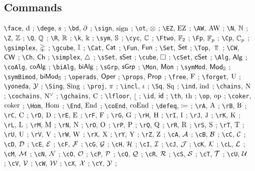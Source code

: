 \subsection*{Commands}

\verb|\face|, $\operatorname{d}$ ;
\verb|\dege|, $\operatorname{s}$ ;
\verb|\bd|, $\operatorname{\partial}$ ;
\verb|\sign|, $\operatorname{sign}$ ;
\verb|\ot|, $\otimes$ ;
\verb|\EZ|, $\operatorname{EZ}$ ;
\verb|\AW|, $\operatorname{AW}$ ;
\verb|\N|, $\mathbb{N}$ ;
\verb|\Z|, $\mathbb{Z}$ ;
\verb|\Q|, $\mathbb{Q}$ ;
\verb|\R|, $\mathbb{R}$ ;
\verb|\k|, $\Bbbk$ ;
\verb|\sym|, $\mathbb{S}$ ;
\verb|\cyc|, $\mathbb{C}$ ;
\verb|\Ftwo|, ${\mathbb{F}_2}$ ;
\verb|\Fp|, ${\mathbb{F}_p}$ ;
\verb|\Cp|, ${\mathbb{C}_p}$ ;
\verb|\gsimplex|, $\mathbb{\Delta}$ ;
\verb|\gcube|, $\mathbb{I}$ ;
\verb|\Cat|, $\mathsf{Cat}$ ;
\verb|\Fun|, $\mathsf{Fun}$ ;
\verb|\Set|, $\mathsf{Set}$ ;
\verb|\Top|, $\Top$ ;
\verb|\CW|, $\mathsf{CW}$ ;
\verb|\Ch|, $\mathsf{Ch}$ ;
\verb|\simplex|, $\triangle$ ;
\verb|\sSet|, $\mathsf{sSet}$ ;
\verb|\cube|, $\square$ ;
\verb|\cSet|, $\mathsf{cSet}$ ;
\verb|\Alg|, $\mathsf{Alg}$ ;
\verb|\coAlg|, $\mathsf{coAlg}$ ;
\verb|\biAlg|, $\mathsf{biAlg}$ ;
\verb|\sGrp|, $\mathsf{sGrp}$ ;
\verb|\Mon|, $\mathsf{Mon}$ ;
\verb|\symMod|, $\mathsf{Mod}_{\mathbb{S}}$ ;
\verb|\symBimod|, $\mathsf{biMod}_{\mathbb{S}}$ ;
\verb|\operads|, $\mathsf{Oper}$ ;
\verb|\props|, $\mathsf{Prop}$ ;
\verb|\free|, $\operatorname{F}$ ;
\verb|\forget|, $\operatorname{U}$ ;
\verb|\yoneda|, $\operatorname{\mathcal{Y}}$ ;
\verb|\Sing|, $\operatorname{Sing}$ ;
\verb|\proj|, $\operatorname{\pi}$ ;
\verb|\incl|, $\operatorname{\iota}$ ;
\verb|\Sq|, $\operatorname{Sq}$ ;
\verb|\ind|, $\operatorname{ind}$ ;
\verb|\chains|, $\operatorname{N}$ ;
\verb|\cochains|, $\operatorname{N^{\vee}}$ ;
\verb|\gchains|, $\operatorname{C}$ ;
\verb|\lfloor|, $\lfloor$ ;
\verb|\id|, $\mathsf{id}$ ;
\verb|\th|, $\mathrm{th}$ ;
\verb|\op|, $\mathrm{op}$ ;
\verb|\coker|, $\operatorname{coker}$ ;
\verb|\Hom|, $\mathrm{Hom}$ ;
\verb|\End|, $\mathrm{End}$ ;
\verb|\coEnd|, $\mathrm{coEnd}$ ;
\verb|\defeq|, $\coloneqq$ ;
\verb|\rA|, $\mathrm{A}$ ;
\verb|\rB|, $\mathrm{B}$ ;
\verb|\rC|, $\mathrm{C}$ ;
\verb|\rD|, $\mathrm{D}$ ;
\verb|\rE|, $\mathrm{E}$ ;
\verb|\rF|, $\mathrm{F}$ ;
\verb|\rG|, $\mathrm{G}$ ;
\verb|\rH|, $\mathrm{H}$ ;
\verb|\rI|, $\mathrm{I}$ ;
\verb|\rJ|, $\mathrm{J}$ ;
\verb|\rK|, $\mathrm{K}$ ;
\verb|\rL|, $\mathrm{L}$ ;
\verb|\rM|, $\mathrm{M}$ ;
\verb|\rN|, $\mathrm{N}$ ;
\verb|\rO|, $\mathrm{O}$ ;
\verb|\rP|, $\mathrm{P}$ ;
\verb|\rQ|, $\mathrm{Q}$ ;
\verb|\rR|, $\mathrm{R}$ ;
\verb|\rS|, $\mathrm{S}$ ;
\verb|\rT|, $\mathrm{T}$ ;
\verb|\rU|, $\mathrm{U}$ ;
\verb|\rV|, $\mathrm{V}$ ;
\verb|\rW|, $\mathrm{W}$ ;
\verb|\rX|, $\mathrm{X}$ ;
\verb|\rY|, $\mathrm{Y}$ ;
\verb|\rZ|, $\mathrm{Z}$ ;
\verb|\cA|, $\mathcal{A}$ ;
\verb|\cB|, $\mathcal{B}$ ;
\verb|\cC|, $\mathcal{C}$ ;
\verb|\cD|, $\mathcal{D}$ ;
\verb|\cE|, $\mathcal{E}$ ;
\verb|\cF|, $\mathcal{F}$ ;
\verb|\cG|, $\mathcal{G}$ ;
\verb|\cH|, $\mathcal{H}$ ;
\verb|\cI|, $\mathcal{I}$ ;
\verb|\cJ|, $\mathcal{J}$ ;
\verb|\cK|, $\mathcal{K}$ ;
\verb|\cL|, $\mathcal{L}$ ;
\verb|\cM|, $\mathcal{M}$ ;
\verb|\cN|, $\mathcal{N}$ ;
\verb|\cO|, $\mathcal{O}$ ;
\verb|\cP|, $\mathcal{P}$ ;
\verb|\cQ|, $\mathcal{Q}$ ;
\verb|\cR|, $\mathcal{R}$ ;
\verb|\cS|, $\mathcal{S}$ ;
\verb|\cT|, $\mathcal{T}$ ;
\verb|\cU|, $\mathcal{U}$ ;
\verb|\cV|, $\mathcal{V}$ ;
\verb|\cW|, $\mathcal{W}$ ;
\verb|\cX|, $\mathcal{X}$ ;
\verb|\cY|, $\mathcal{Y}$ ;
